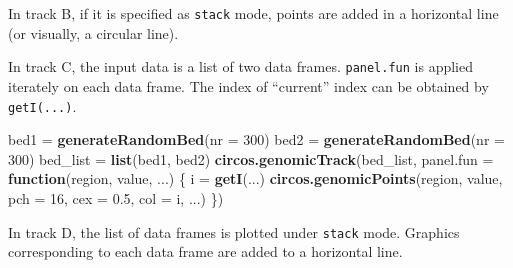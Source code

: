 \documentclass[]{book}
\newenvironment{Shaded}{\begin{snugshade}}{\end{snugshade}}
\newcommand{\KeywordTok}[1]{\textcolor[rgb]{0.13,0.29,0.53}{\textbf{#1}}}
\newcommand{\DataTypeTok}[1]{\textcolor[rgb]{0.13,0.29,0.53}{#1}}
\newcommand{\DecValTok}[1]{\textcolor[rgb]{0.00,0.00,0.81}{#1}}
\newcommand{\FloatTok}[1]{\textcolor[rgb]{0.00,0.00,0.81}{#1}}
\newcommand{\StringTok}[1]{\textcolor[rgb]{0.31,0.60,0.02}{#1}}
\newcommand{\OtherTok}[1]{\textcolor[rgb]{0.56,0.35,0.01}{#1}}
\newcommand{\ControlFlowTok}[1]{\textcolor[rgb]{0.13,0.29,0.53}{\textbf{#1}}}
\newcommand{\OperatorTok}[1]{\textcolor[rgb]{0.81,0.36,0.00}{\textbf{#1}}}
\newcommand{\NormalTok}[1]{#1}
\theoremstyle{definition}
\theoremstyle{definition}
\theoremstyle{remark}
\begin{document}
In track B, if it is specified as \texttt{stack} mode, points are added
in a horizontal line (or visually, a circular line).

\begin{Shaded}
\end{Shaded}

In track C, the input data is a list of two data frames.
\texttt{panel.fun} is applied iterately on each data frame. The index of
``current'' index can be obtained by \texttt{getI(...)}.

\begin{Shaded}
\begin{Highlighting}[]
\NormalTok{bed1 =}\StringTok{ }\KeywordTok{generateRandomBed}\NormalTok{(}\DataTypeTok{nr =} \DecValTok{300}\NormalTok{)}
\NormalTok{bed2 =}\StringTok{ }\KeywordTok{generateRandomBed}\NormalTok{(}\DataTypeTok{nr =} \DecValTok{300}\NormalTok{)}
\NormalTok{bed_list =}\StringTok{ }\KeywordTok{list}\NormalTok{(bed1, bed2)}
\KeywordTok{circos.genomicTrack}\NormalTok{(bed_list, }
    \DataTypeTok{panel.fun =} \ControlFlowTok{function}\NormalTok{(region, value, ...) \{}
\NormalTok{        i =}\StringTok{ }\KeywordTok{getI}\NormalTok{(...)}
        \KeywordTok{circos.genomicPoints}\NormalTok{(region, value, }\DataTypeTok{pch =} \DecValTok{16}\NormalTok{, }\DataTypeTok{cex =} \FloatTok{0.5}\NormalTok{, }\DataTypeTok{col =}\NormalTok{ i, ...)}
\NormalTok{\})}
\end{Highlighting}
\end{Shaded}

In track D, the list of data frames is plotted under \texttt{stack}
mode. Graphics corresponding to each data frame are added to a
horizontal line.
\end{document}
